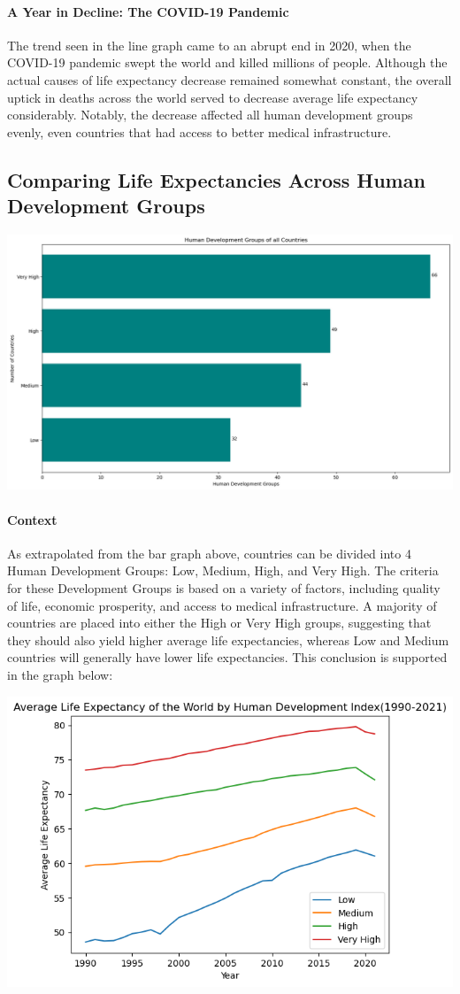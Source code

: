 \documentclass{article}
\begin{document}
\paragraph{A Year in Decline: The COVID-19 Pandemic}

The trend seen in the line graph came to an abrupt end in 2020, when the COVID-19 pandemic swept the world and killed millions of people. Although the actual causes of life expectancy decrease remained somewhat constant, the overall uptick in deaths across the world served to decrease average life expectancy considerably. Notably, the decrease affected all human development groups evenly, even countries that had access to better medical infrastructure.

\subsection{Comparing Life Expectancies Across Human Development Groups}

\includegraphics[width=0.7\linewidth]{files/490bc14e53c1c451efc0b8a57d512a7e.png}

\paragraph{Context}

As extrapolated from the bar graph above, countries can be divided into 4 Human Development Groups: Low, Medium, High, and Very High. The criteria for these Development Groups is based on a variety of factors, including quality of life, economic prosperity, and access to medical infrastructure. A majority of countries are placed into either the High or Very High groups, suggesting that they should also yield higher average life expectancies, whereas Low and Medium countries will generally have lower life expectancies. This conclusion is supported in the graph below:

\includegraphics[width=0.7\linewidth]{files/ae930fdd7fbb8fa24ba29225b51cd6b8.png}
\end{document}
